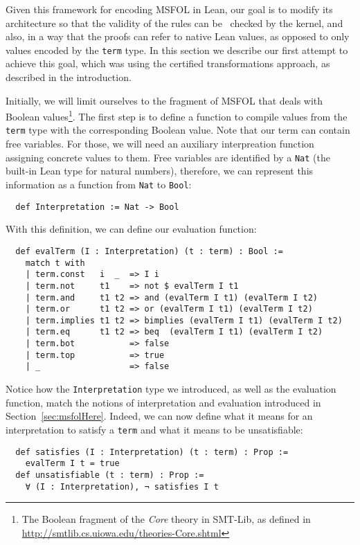 Given this framework for encoding MSFOL in Lean, our goal is to
modify its architecture so that the validity of the rules can be \
checked by the kernel, and also, in a way that the proofs can refer
to native Lean values, as opposed to only values encoded by the
\texttt{term} type. In this section we describe our first attempt
to achieve this goal, which was using the certified transformations
approach, as described in the introduction.

Initially, we will limit ourselves to the fragment of MSFOL that
deals with Boolean values\footnote{The Boolean fragment of the \emph{Core} theory in SMT-Lib, as defined in \url{http://smtlib.cs.uiowa.edu/theories-Core.shtml}}.
The first step is to define a function to compile values from the \texttt{term} type with the corresponding Boolean value. Note that our term can contain free variables. For those, we will need an auxiliary interpreation function assigning concrete values to them.
Free variables are
identified by a \texttt{Nat} (the built-in Lean type for natural numbers), therefore, we can
represent this information as a function from \texttt{Nat} to
\texttt{Bool}:

\begin{verbatim}
  def Interpretation := Nat -> Bool
\end{verbatim}

With this definition, we can define our evaluation function:

\begin{verbatim}
  def evalTerm (I : Interpretation) (t : term) : Bool :=
    match t with
    | term.const   i  _  => I i
    | term.not     t1    => not $ evalTerm I t1
    | term.and     t1 t2 => and (evalTerm I t1) (evalTerm I t2)
    | term.or      t1 t2 => or (evalTerm I t1) (evalTerm I t2)
    | term.implies t1 t2 => bimplies (evalTerm I t1) (evalTerm I t2)
    | term.eq      t1 t2 => beq  (evalTerm I t1) (evalTerm I t2)
    | term.bot           => false
    | term.top           => true
    | _                  => false
\end{verbatim}

Notice how the \texttt{Interpretation} type we introduced, as well as the evaluation function, match the notions of interpretation and evaluation introduced in Section~\ref{sec:msfolHere}. Indeed, we can now define what it means for an interpretation to satisfy a \texttt{term} and what it means to be unsatisfiable:

\begin{verbatim}
  def satisfies (I : Interpretation) (t : term) : Prop :=
    evalTerm I t = true
  def unsatisfiable (t : term) : Prop :=
    ∀ (I : Interpretation), ¬ satisfies I t
\end{verbatim}

